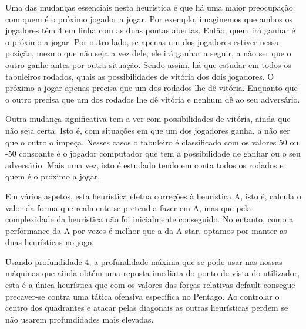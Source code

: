 Uma das mudanças essenciais nesta heurística é que há uma maior preocupação com quem é o próximo jogador a jogar. Por exemplo, imaginemos que ambos os jogadores têm 4 em linha com as duas pontas abertas. Então, quem irá ganhar é o próximo a jogar. Por outro lado, se apenas um dos jogadores estiver nessa posição, mesmo que não seja a vez dele, ele irá ganhar a seguir, a não ser que o outro ganhe antes por outra situação. Sendo assim, há que estudar em todos os tabuleiros rodados, quais as possibilidades de vitória dos dois jogadores. O próximo a jogar apenas precisa que um dos rodados lhe dê vitória. Enquanto que o outro precisa que um dos rodados lhe dê vitória e nenhum dê ao seu adversário.

Outra mudança significativa tem a ver com possibilidades de vitória, ainda que não seja certa. Isto é, com situações em que um dos jogadores ganha, a não ser que o outro o impeça. Nesses casos o tabuleiro é classificado com os valores 50 ou -50 consoante é o jogador computador que tem a possibilidade de ganhar ou o seu adversário. Mais uma vez, isto é estudado tendo em conta todos os rodados e quem é o próximo a jogar.

Em vários aspetos, esta heurística efetua correções à heurística A, isto é, calcula o valor da forma que realmente se pretendia fazer em A, mas que pela complexidade da heurística não foi inicialmente conseguido. No entanto, como a performance da A por vezes é melhor que a da A star, optamos por manter as duas heurísticas no jogo.

Usando profundidade 4, a profundidade máxima que se pode usar nas nossas máquinas que ainda obtém uma reposta imediata do ponto de vista do utilizador, esta é a única heurística que com os valores das forças relativas default consegue precaver-se contra uma tática ofensiva específica no Pentago. Ao controlar o centro dos quadrantes e atacar pelas diagonais as outras heurísticas perdem se não usarem profundidades mais elevadas. 